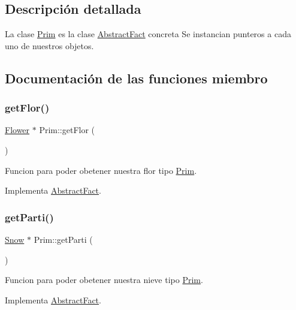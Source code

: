 \subsection{Descripción detallada}
La clase \hyperlink{classPrim}{Prim} es la clase \hyperlink{classAbstractFact}{Abstract\+Fact} concreta  Se instancian punteros a cada uno de nuestros objetos. 

\subsection{Documentación de las funciones miembro}
\mbox{\label{classPrim_a92e3d118382a67173d008d5d82e4798c}} 
\subsubsection{\texorpdfstring{get\+Flor()}{getFlor()}}
{\footnotesize\ttfamily \hyperlink{classFlower}{Flower} $\ast$ Prim\+::get\+Flor (\begin{DoxyParamCaption}{ }\end{DoxyParamCaption})\hspace{0.3cm}{\ttfamily [virtual]}}

Funcion para poder obetener nuestra flor tipo \hyperlink{classPrim}{Prim}. 

Implementa \hyperlink{classAbstractFact_a9ee9f34bc189886b24e325ff2412a1d9}{Abstract\+Fact}.

\mbox{\label{classPrim_ae2c1e853547a33662bd00baff26d67f8}} 
\subsubsection{\texorpdfstring{get\+Parti()}{getParti()}}
{\footnotesize\ttfamily \hyperlink{classSnow}{Snow} $\ast$ Prim\+::get\+Parti (\begin{DoxyParamCaption}{ }\end{DoxyParamCaption})\hspace{0.3cm}{\ttfamily [virtual]}}

Funcion para poder obetener nuestra nieve tipo \hyperlink{classPrim}{Prim}. 

Implementa \hyperlink{classAbstractFact_a7b642a7fe5615f7103dd7d1ab4c801d9}{Abstract\+Fact}.

